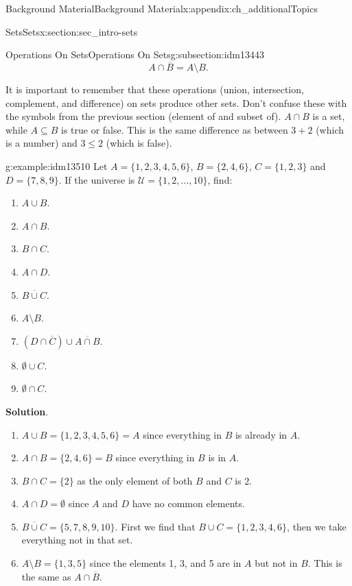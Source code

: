 \documentclass[oneside,10pt,]{book}
\numberwithin{equation}{chapter}
\def\U{\mathcal U}
\begin{document}
\begin{appendixptx}{Background Material}{}{Background Material}{}{}{x:appendix:ch_additionalTopics}
\begin{sectionptx}{Sets}{}{Sets}{}{}{x:section:sec_intro-sets}
\begin{subsectionptx}{Operations On Sets}{}{Operations On Sets}{}{}{g:subsection:idm13443}
\begin{equation*}
A \cap \overline B = A \setminus B.
\end{equation*}
%
\par
It is important to remember that these operations (union, intersection, complement, and difference) on sets produce other sets. Don't confuse these with the symbols from the previous section (element of and subset of). \(A \cap B\) is a set, while \(A \subseteq B\) is true or false. This is the same difference as between \(3 + 2\) (which is a number) and \(3 \le 2\) (which is false).%
\begin{example}{}{g:example:idm13510}%
Let \(A = \{1, 2, 3, 4, 5, 6\}\), \(B = \{2, 4, 6\}\), \(C = \{1, 2, 3\}\) and \(D = \{7, 8, 9\}\). If the universe is \(\U = \{1, 2, \ldots, 10\}\), find:%
\begin{enumerate}
\item{}\(A \cup B\).%
\item{}\(A \cap B\).%
\item{}\(B \cap C\).%
\item{}\(A \cap D\).%
\item{}\(\overline{B \cup C}\).%
\item{}\(A \setminus B\).%
\item{}\((D \cap \overline C) \cup \overline{A \cap B}\).%
\item{}\(\emptyset \cup C\).%
\item{}\(\emptyset \cap C\).%
\end{enumerate}
%
\par\smallskip%
\noindent\textbf{Solution}.\hypertarget{g:solution:idm13537}{}\quad{}%
\begin{enumerate}
\item{}\(A \cup B = \{1, 2, 3, 4, 5, 6\} = A\) since everything in \(B\) is already in \(A\).%
\item{}\(A \cap B = \{2, 4, 6\} = B\) since everything in \(B\) is in \(A\).%
\item{}\(B \cap C = \{2\}\) as the only element of both \(B\) and \(C\) is 2.%
\item{}\(A \cap D = \emptyset\) since \(A\) and \(D\) have no common elements.%
\item{}\(\overline{B \cup C} = \{5, 7, 8, 9, 10\}\). First we find that \(B \cup C = \{1, 2, 3, 4, 6\}\), then we take everything not in that set.%
\item{}\(A \setminus B = \{1, 3, 5\}\) since the elements 1, 3, and 5 are in \(A\) but not in \(B\). This is the same as \(A \cap \overline B\).%

\end{enumerate}
\end{example}
\end{subsectionptx}
\end{sectionptx}
\end{appendixptx}
\end{document}
